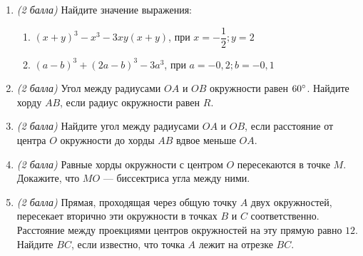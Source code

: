 \documentclass[12pt, a4paper]{article}
\begin{document}
	
	\begin{enumerate}
		\item \textit{(2 балла)} Найдите значение выражения: 
		\begin{enumerate}[label=\asbuk*)]
			\item $(x+y)^3-x^3-3xy(x+y)$, при $x=-\dfrac{1}{2}; y=2$
			\item $(a-b)^3+(2a-b)^3-3a^3$, при $a=-0,2; b=-0,1$
		\end{enumerate}	
		\item \textit{(2 балла)} Угол между радиусами $OA$ и $OB$ окружности равен $60\degree$. Найдите хорду $AB$, если радиус окружности равен $R$.
		\item \textit{(2 балла)} Найдите угол между радиусами $OA$ и $OB$, если расстояние от центра $O$ окружности до хорды $AB$ вдвое меньше $OA$.
		\item \textit{(2 балла)} Равные хорды окружности с центром $O$ пересекаются в точке $M$. Докажите, что $MO$ — биссектриса угла между ними.
		\item \textit{(2 балла)} Прямая, проходящая через общую точку $A$ двух окружностей, пересекает вторично эти окружности в точках $B$ и $C$ соответственно. Расстояние между проекциями центров окружностей на эту прямую равно $12$. Найдите $BC$, если известно, что точка $A$ лежит на отрезке $BC$.

	\end{enumerate}
\end{document}
